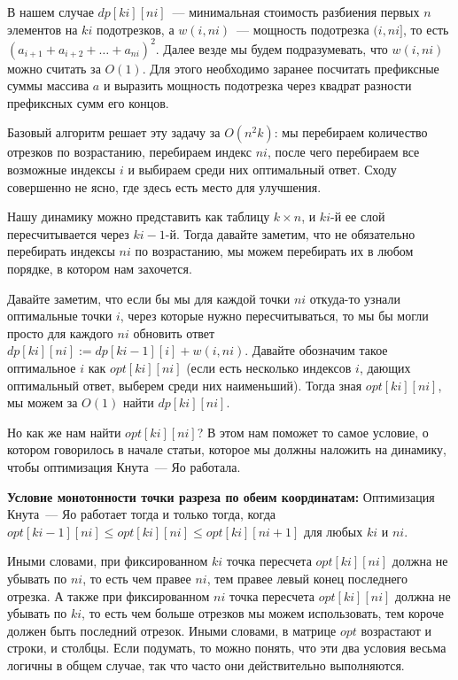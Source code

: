 В нашем случае $dp[ki][ni]$~--- минимальная стоимость разбиения первых $n$ элементов на $ki$ подотрезков, а $w(i, ni)$~--- мощность подотрезка $(i, ni]$, то есть $(a_{i + 1} + a_{i + 2} + \ldots + a_{ni})^2$. Далее везде мы будем подразумевать, что $w(i, ni)$ можно считать за $O(1)$. Для этого необходимо заранее посчитать префиксные суммы массива $a$ и выразить мощность подотрезка через квадрат разности префиксных сумм его концов.

Базовый алгоритм решает эту задачу за $O(n^2 k)$: мы перебираем количество отрезков по возрастанию, перебираем индекс $ni$, после чего перебираем все возможные индексы $i$ и выбираем среди них оптимальный ответ. Сходу совершенно не ясно, где здесь есть место для улучшения.

Нашу динамику можно представить как таблицу $k \times n$, и $ki$-й ее слой пересчитывается через $ki-1$-й. Тогда давайте заметим, что не обязательно перебирать индексы $ni$ по возрастанию, мы можем перебирать их в любом порядке, в котором нам захочется.

Давайте заметим, что если бы мы для каждой точки $ni$ откуда-то узнали оптимальные точки $i$, через которые нужно пересчитываться, то мы бы могли просто для каждого $ni$ обновить ответ $dp[ki][ni] := dp[ki - 1][i] + w(i, ni)$. Давайте обозначим такое оптимальное $i$ как $opt[ki][ni]$ (если есть несколько индексов $i$, дающих оптимальный ответ, выберем среди них наименьший). Тогда зная $opt[ki][ni]$, мы можем за $O(1)$ найти $dp[ki][ni]$.

Но как же нам найти $opt[ki][ni]$? В этом нам поможет то самое условие, о котором говорилось в начале статьи, которое мы должны наложить на динамику, чтобы оптимизация Кнута~--- Яо работала.

\textbf{Условие монотонности точки разреза по обеим координатам:} Оптимизация Кнута~--- Яо работает тогда и только тогда, когда $opt[ki - 1][ni] \le opt[ki][ni] \le opt[ki][ni + 1]$ для любых $ki$ и $ni$.

Иными словами, при фиксированном $ki$ точка пересчета $opt[ki][ni]$ должна не убывать по $ni$, то есть чем правее $ni$, тем правее левый конец последнего отрезка. А также при фиксированном $ni$ точка пересчета $opt[ki][ni]$ должна не убывать по $ki$, то есть чем больше отрезков мы можем использовать, тем короче должен быть последний отрезок. Иными словами, в матрице $opt$ возрастают и строки, и столбцы. Если подумать, то можно понять, что эти два условия весьма логичны в общем случае, так что часто они действительно выполняются.

